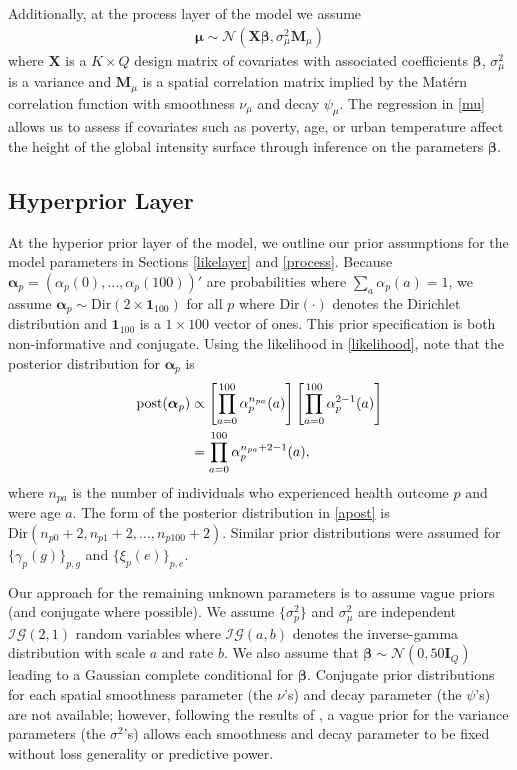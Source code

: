 \documentclass[final]{statsoc}
\begin{document}
Additionally, at the process layer of the model we assume 
\begin{align}
\boldsymbol{\mu} \sim \mathcal{N}(\mathbf{X}\boldsymbol{\beta},\sigma^2_\mu\mathbf{M}_\mu)
\label{mu}
\end{align}
where $\mathbf{X}$ is a $K\times Q$ design matrix of covariates with associated coefficients 
$\boldsymbol{\beta}$, $\sigma^2_\mu$ is a variance and $\mathbf{M}_\mu$ is a spatial correlation 
matrix implied by the Mat\'{e}rn correlation function with smoothness $\nu_\mu$ and 
decay $\psi_\mu$. The regression in \eqref{mu} allows us to assess if covariates such as 
poverty, age, or urban temperature affect the height of the global intensity surface 
through inference on the parameters $\boldsymbol{\beta}$.

\subsection{Hyperprior Layer}
At the hyperior prior layer of the model, we outline our prior assumptions for the model 
parameters in Sections \ref{likelayer} and \ref{process}. Because $\boldsymbol{\alpha}_p = 
(\alpha_p(0),\dots,\alpha_p(100))'$ are probabilities where $\sum_a \alpha_p(a) = 1$, 
we assume $\boldsymbol{\alpha}_{p} \sim \text{Dir}(2\times\mathbf{1}_{100})$ for all $p$ where 
$\text{Dir}(\cdot)$ denotes the Dirichlet distribution and $\mathbf{1}_{100}$ is a $1\times 100$ vector of ones. This prior specification is both non-informative and conjugate. 
Using the likelihood in \eqref{likelihood}, note that the posterior distribution for 
$\boldsymbol{\alpha}_p$ is
\begin{align}
\text{post}(\boldsymbol{\alpha}_p) &\propto \left[\prod_{a=0}^{100} \alpha_p^{n_{pa}}(a)\right]
\left[\prod_{a=0}^{100}\alpha_p^{2-1}(a)\right] \notag \\
&= \prod_{a=0}^{100} \alpha_p^{n_{pa}+2-1}(a),
\label{apost}
\end{align} 
where $n_{pa}$ is the number of individuals who experienced health outcome $p$ and were age 
$a$. The form of the posterior distribution in \eqref{apost} is $\text{Dir}(n_{p0}+2,n_{p1}+2,
\dots,n_{p100}+2)$. Similar prior distributions were assumed for $\{\gamma_p(g)\}_{p,g}$ 
and $\{\xi_p(e)\}_{p,e}$.

Our approach for the remaining unknown parameters is to assume vague priors (and conjugate 
where possible). We assume $\{\sigma^2_p\}$ and $\sigma^2_\mu$ are independent 
$\mathcal{IG}\left(2, 1\right)$ 
random variables where $\mathcal{IG}(a,b)$ denotes the inverse-gamma distribution with scale 
$a$ and rate $b$. We also assume that $\boldsymbol{\beta} \sim 
\mathcal{N}(0, 50\mathbf{I}_{Q})$ leading to a Gaussian complete conditional for $\boldsymbol{\beta}$.  
Conjugate prior distributions for each spatial smoothness parameter (the $\nu$'s) and decay 
parameter (the $\psi$'s) are not available; however, following the results of \cite{Zhang2004}, 
a vague prior for the variance parameters (the $\sigma^2$'s) allows each smoothness and decay 
parameter to be fixed without loss generality or predictive power.
\end{document}
